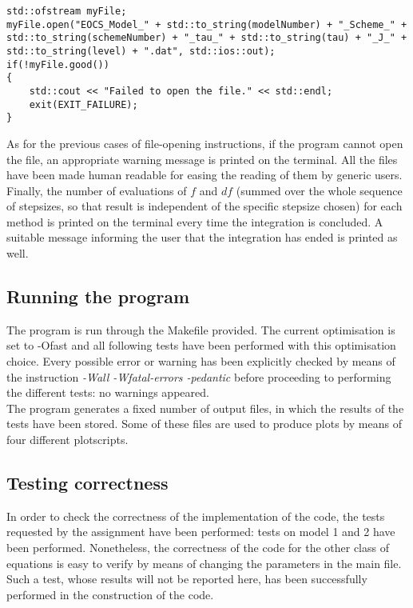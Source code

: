 \documentclass[11pt]{article}
\theoremstyle{theorem}
\theoremstyle{definition}
\begin{document}
\begin{lstlisting}
std::ofstream myFile;
myFile.open("EOCS_Model_" + std::to_string(modelNumber) + "_Scheme_" + std::to_string(schemeNumber) + "_tau_" + std::to_string(tau) + "_J_" + std::to_string(level) + ".dat", std::ios::out);
if(!myFile.good())
{
	std::cout << "Failed to open the file." << std::endl;
	exit(EXIT_FAILURE);
}
\end{lstlisting}

As for the previous cases of file-opening instructions, if the program cannot open the file, an appropriate warning message is printed on the terminal. All the files have been made human readable for easing the reading of them by generic users.\\
Finally, the number of evaluations of $f$ and $df$ (summed over the whole sequence of stepsizes, so that result is independent of the specific stepsize chosen) for each method is printed on the terminal every time the integration is concluded. A suitable message informing the user that the integration has ended is printed as well.\\

\subsection{Running the program}
The program is run through the Makefile provided. The current optimisation is set to -Ofast and all following tests have been performed with this optimisation choice. Every possible error or warning has been explicitly checked by means of the instruction \emph{-Wall -Wfatal-errors -pedantic} before proceeding to performing the different tests: no warnings appeared.\\
The program generates a fixed number of output files, in which the results of the tests have been stored. Some of these files are used to produce plots by means of four different plotscripts.\\ 

\subsection{Testing correctness}
In order to check the correctness of the implementation of the code, the tests requested by the assignment have been performed: tests on model 1 and 2 have been performed. Nonetheless, the correctness of the code for the other class of equations is easy to verify by means of changing the parameters in the main file. Such a test, whose results will not be reported here, has been successfully performed in the construction of the code.\\
\end{document}
